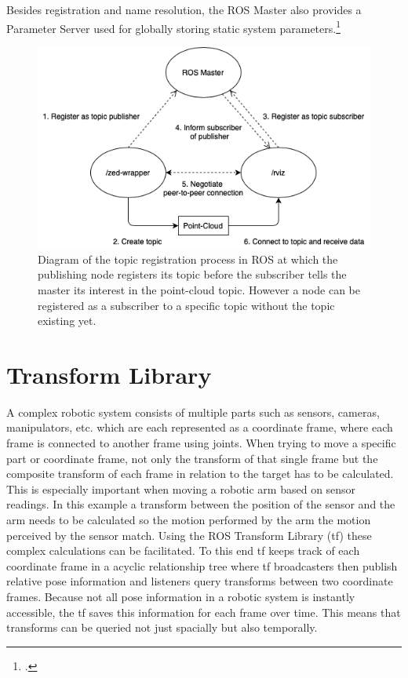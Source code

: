Besides registration and name resolution, the ROS Master also provides a Parameter Server used for globally storing static system parameters.\footcite{openSourceRoboticsFoundationParameterServerNodate}
\begin{figure}[]
	\centering
	\includegraphics[width=0.8\linewidth]{img/ros_master_registration}
	\caption{Diagram of the topic registration process in ROS at which the publishing node registers its topic before the subscriber tells the master its interest in the point-cloud topic. However a node can be registered as a subscriber to a specific topic without the topic existing yet.}
		\label{fig:ros_master_reg}
\end{figure}



\section{Transform Library}
A complex robotic system consists of multiple parts such as sensors, cameras, manipulators, etc. which are each represented as a coordinate frame, where each frame is connected to another frame using joints. When trying to move a specific part or coordinate frame, not only the transform of that single frame but the composite transform of each frame in relation to the target has to be calculated. This is especially important when moving a robotic arm based on sensor readings. In this example a transform between the position of the sensor and the arm needs to be calculated so the motion performed by the arm the motion perceived by the sensor match.
Using the ROS Transform Library (tf) these complex calculations can be facilitated. To this end tf keeps track of each coordinate frame in a acyclic relationship tree where tf broadcasters then publish relative pose information and listeners query transforms between two coordinate frames. 
Because not all pose information in a robotic system is instantly accessible, the tf saves this information for each frame over time. This means that transforms can be queried not just spacially but also temporally.



